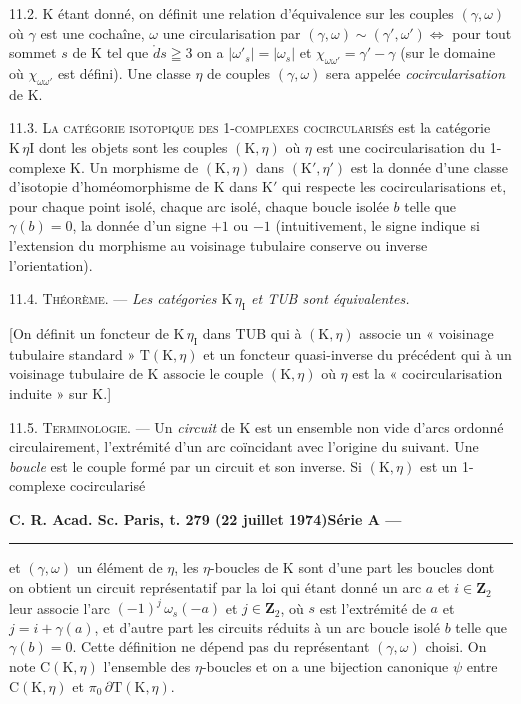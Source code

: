 11.2. \(\mathrm{K}\) étant donné, on définit une relation d'équivalence sur les couples \((\gamma,\omega)\) où \(\gamma\) est une cochaîne, \(\omega\) une circularisation par \((\gamma,\omega)\sim(\gamma',\omega')\Leftrightarrow\) pour tout sommet \(s\) de \(\mathrm{K}\) tel que \(\mathring d s\geqq3\) on a \(\lvert\omega'_s\rvert=\lvert\omega_s\rvert\) et \(\chi_{\omega\omega'}=\gamma'-\gamma\) (sur le domaine où \(\chi_{\omega\omega'}\) est défini). Une classe \(\eta\) de couples \((\gamma,\omega)\) sera appelée \textit{cocircularisation} de \(\mathrm{K}\).

11.3. \textsc{La catégorie isotopique des 1-complexes cocircularisés} est la catégorie \(\mathrm{K}\,\eta{\scriptstyle\mathrm{I}}\) dont les objets sont les couples \((\mathrm{K},\eta)\) où \(\eta\) est une cocircularisation du 1-complexe \(\mathrm{K}\). Un morphisme de \((\mathrm{K},\eta)\) dans \((\mathrm{K}',\eta')\) est la donnée d'une classe d'isotopie d'homéomorphisme de \(\mathrm{K}\) dans \(\mathrm{K}'\) qui respecte les cocircularisations et, pour chaque point isolé, chaque arc isolé, chaque boucle isolée \(b\) telle que \(\gamma(b)=0\), la donnée d'un signe \(+1\) ou \(-1\) (intuitivement, le signe indique si l'extension du morphisme au voisinage tubulaire conserve ou inverse l'orientation).

11.4. \textsc{Théorème.} --- \textit{Les catégories \(\mathrm{K}\,\eta_{\mathrm{I}}\) et TUB sont équivalentes.}

[On définit un foncteur de \(\mathrm{K}\,\eta_{\mathrm{I}}\) dans TUB qui à \((\mathrm{K},\eta)\) associe un « voisinage tubulaire standard » \(\mathrm{T}(\mathrm{K},\eta)\) et un foncteur quasi-inverse du précédent qui à un voisinage tubulaire de \(\mathrm{K}\) associe le couple \((\mathrm{K},\eta)\) où \(\eta\) est la « cocircularisation induite » sur \(\mathrm{K}\).]

11.5. \textsc{Terminologie.} --- Un \textit{circuit} de \(\mathrm{K}\) est un ensemble non vide d'arcs ordonné circulairement, l'extrémité d'un arc coïncidant avec l'origine du suivant. Une \textit{boucle} est le couple formé par un circuit et son inverse. Si \((\mathrm{K},\eta)\) est un 1-complexe cocircularisé

\textbf{C. R. Acad. Sc. Paris, t. 279 (22 juillet 1974)}\hfill\textbf{Série A ---}\par\noindent\rule{\linewidth}{.35pt}\par

et \((\gamma,\omega)\) un élément de \(\eta\), les \(\eta\)-boucles de \(\mathrm{K}\) sont d'une part les boucles dont on obtient un circuit représentatif par la loi qui étant donné un arc \(a\) et \(i\in\mathbf{Z}_2\) leur associe l'arc \((-1)^j\,\omega_s(-a)\) et \(j\in\mathbf{Z}_2\), où \(s\) est l'extrémité de \(a\) et \(j=i+\gamma(a)\), et d'autre part les circuits réduits à un arc boucle isolé \(b\) telle que \(\gamma(b)=0\). Cette définition ne dépend pas du représentant \((\gamma,\omega)\) choisi. On note \(\mathrm{C}(\mathrm{K},\eta)\) l'ensemble des \(\eta\)-boucles et on a une bijection canonique \(\psi\) entre \(\mathrm{C}(\mathrm{K},\eta)\) et \(\pi_0\,\partial\mathrm{T}(\mathrm{K},\eta)\).


